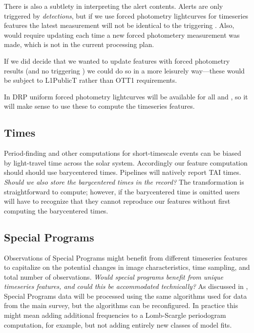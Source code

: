 \documentclass[DM,authoryear,toc]{lsstdoc}
\begin{document}
There is also a subtlety in interpreting the alert contents.
Alerts are only triggered by \DIASource \textit{detections}, but if we use forced photometry lightcurves for timeseries features the latest measurement will not be identical to the triggering \DIASource.
Also, \DIAObjects would require updating each time a new forced photometery measurement was made, which is not in the current processing plan.

If we did decide that we wanted to update \DIAObject features with forced photometry results (and no triggering \DIASource) we could do so in a more leisurely way---these would be subject to L1PublicT rather than OTT1 requirements.

In DRP uniform forced photometry lightcurves will be available for all \Objects and \DIAObjects, so it will make sense to use these to compute the timeseries features.

\subsection{Times}

Period-finding and other computations for short-timescale events can be biased by light-travel time across the solar system.
Accordingly our feature computation should should use barycentered times.  
Pipelines will natively report TAI times.
\textit{Should we also store the barycentered times in the \DIASource record?}
The transformation is straightforward to compute; however, if the barycentered time is omitted users will have to recognize that they cannot reproduce our features without first computing the barycentered times.

\subsection{Special Programs}

Observations of Special Programs might benefit from different timeseries features to capitalize on the potential changes in image characteristics, time sampling, and total number of observations.
\textit{Would special programs benefit from unique timeseries features, and could this be accommodated technically?}
As discussed in , Special Programs data will be processed using the same algorithms used for data from the main survey, but the algorithms can be reconfigured.
In practice this might mean adding additional frequencies to a Lomb-Scargle periodogram computation, for example, but not adding entirely new classes of model fits.
\end{document}
